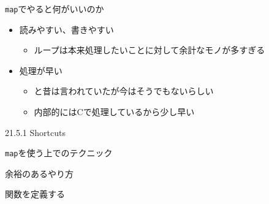 \documentclass[ignorenonframetext,]{beamer}
\newenvironment{Shaded}{\begin{snugshade}}{\end{snugshade}}
\newcommand{\KeywordTok}[1]{\textcolor[rgb]{0.13,0.29,0.53}{\textbf{#1}}}
\newcommand{\DataTypeTok}[1]{\textcolor[rgb]{0.13,0.29,0.53}{#1}}
\newcommand{\StringTok}[1]{\textcolor[rgb]{0.31,0.60,0.02}{#1}}
\newcommand{\ControlFlowTok}[1]{\textcolor[rgb]{0.13,0.29,0.53}{\textbf{#1}}}
\newcommand{\OperatorTok}[1]{\textcolor[rgb]{0.81,0.36,0.00}{\textbf{#1}}}
\newcommand{\NormalTok}[1]{#1}
\providecommand{\tightlist}{%
  \setlength{\itemsep}{0pt}\setlength{\parskip}{0pt}}
\begin{document}
\begin{frame}{\texttt{map}でやると何がいいのか}

\begin{itemize}
\tightlist
\item
  読みやすい、書きやすい

  \begin{itemize}
  \tightlist
  \item
    ループは本来処理したいことに対して余計なモノが多すぎる
  \end{itemize}
\item
  処理が早い

  \begin{itemize}
  \tightlist
  \item
    と昔は言われていたが今はそうでもないらしい
  \item
    内部的にはCで処理しているから少し早い
  \end{itemize}
\end{itemize}

\end{frame}

\begin{frame}[fragile]{21.5.1 Shortcuts}

\texttt{map}を使う上でのテクニック

\end{frame}

\begin{frame}[fragile]{余裕のあるやり方}

関数を定義する

\begin{Shaded}
\end{Shaded}

\end{frame}
\end{document}
